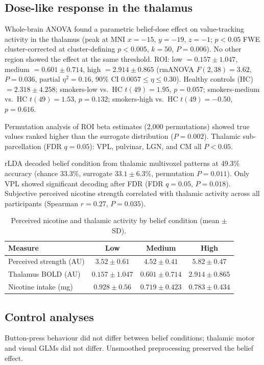\documentclass[11pt]{article}
\begin{document}
\subsection{Dose-like response in the thalamus}
Whole-brain ANOVA found a parametric belief-dose effect on value-tracking activity in the thalamus (peak at MNI $x=-15$, $y=-19$, $z=-1$; $p<0.05$ FWE cluster-corrected at cluster-defining $p<0.005$, $k=50$, $P=0.006$). No other region showed the effect at the same threshold. ROI: low $=0.157 \pm 1.047$, medium $=0.601 \pm 0.714$, high $=2.914 \pm 0.865$ (rmANOVA $F(2,38)=3.62$, $P=0.036$, partial $\eta^2=0.16$, 90\% CI $0.0057 \leq \eta \leq 0.30$). Healthy controls (HC) $=2.318 \pm 4.258$; smokers-low vs.\ HC $t(49)=1.95$, $p=0.057$; smokers-medium vs.\ HC $t(49)=1.53$, $p=0.132$; smokers-high vs.\ HC $t(49)=-0.50$, $p=0.616$.

Permutation analysis of ROI beta estimates (2,000 permutations) showed true values ranked higher than the surrogate distribution ($P=0.002$). Thalamic sub-parcellation (FDR $q=0.05$): VPL, pulvinar, LGN, and CM all $P<0.05$.

rLDA decoded belief condition from thalamic multivoxel patterns at 49.3\% accuracy (chance 33.3\%, surrogate $33.1 \pm 6.3\%$, permutation $P=0.011$). Only VPL showed significant decoding after FDR (FDR $q=0.05$, $P=0.018$). Subjective perceived nicotine strength correlated with thalamic activity across all participants (Spearman $r=0.27$, $P=0.035$).

\begin{table}[h]
\centering
\caption{Perceived nicotine and thalamic activity by belief condition (mean $\pm$ SD).}
\begin{tabular}{lccc}
\toprule
Measure & Low & Medium & High \\
\midrule
Perceived strength (AU) & $3.52 \pm 0.61$ & $4.52 \pm 0.41$ & $5.82 \pm 0.47$ \\
Thalamus BOLD (AU) & $0.157 \pm 1.047$ & $0.601 \pm 0.714$ & $2.914 \pm 0.865$ \\
Nicotine intake (mg) & $0.928 \pm 0.56$ & $0.719 \pm 0.423$ & $0.783 \pm 0.434$ \\
\bottomrule
\end{tabular}
\end{table}

\subsection{Control analyses}
Button-press behaviour did not differ between belief conditions; thalamic motor and visual GLMs did not differ. Unsmoothed preprocessing preserved the belief effect.
\end{document}
